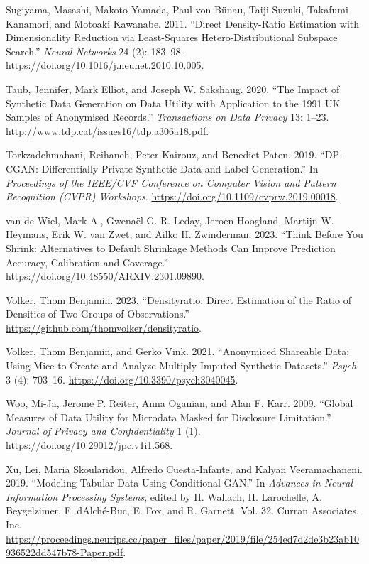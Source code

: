 \documentclass[
]{template/style/uneceart}
\newlength{\cslhangindent}
\newlength{\cslentryspacingunit} %
\newenvironment{CSLReferences}[2] %
 {%
  \setlength{\parindent}{0pt}
  \ifodd #1
  \let\oldpar\par
  \def\par{\hangindent=\cslhangindent\oldpar}
  \fi
  \setlength{\parskip}{#2\cslentryspacingunit}
 }%
 {}
\begin{document}
\begin{CSLReferences}{1}{0}
\leavevmode{}%
Sugiyama, Masashi, Makoto Yamada, Paul von Bünau, Taiji Suzuki, Takafumi
Kanamori, and Motoaki Kawanabe. 2011. {``Direct Density-Ratio Estimation
with Dimensionality Reduction via Least-Squares Hetero-Distributional
Subspace Search.''} \emph{Neural Networks} 24 (2): 183--98.
\url{https://doi.org/10.1016/j.neunet.2010.10.005}.

\leavevmode{}%
Taub, Jennifer, Mark Elliot, and Joseph W. Sakshaug. 2020. {``The Impact
of Synthetic Data Generation on Data Utility with Application to the
1991 UK Samples of Anonymised Records.''} \emph{Transactions on Data
Privacy} 13: 1--23. \url{http://www.tdp.cat/issues16/tdp.a306a18.pdf}.

\leavevmode{}%
Torkzadehmahani, Reihaneh, Peter Kairouz, and Benedict Paten. 2019.
{``{DP-CGAN}: Differentially Private Synthetic Data and Label
Generation.''} In \emph{Proceedings of the IEEE/CVF Conference on
Computer Vision and Pattern Recognition (CVPR) Workshops}.
\url{https://doi.org/10.1109/cvprw.2019.00018}.

\leavevmode{}%
van de Wiel, Mark A., Gwenaël G. R. Leday, Jeroen Hoogland, Martijn W.
Heymans, Erik W. van Zwet, and Ailko H. Zwinderman. 2023. {``Think
Before You Shrink: Alternatives to Default Shrinkage Methods Can Improve
Prediction Accuracy, Calibration and Coverage.''}
\url{https://doi.org/10.48550/ARXIV.2301.09890}.

\leavevmode{}%
Volker, Thom Benjamin. 2023. {``Densityratio: Direct Estimation of the
Ratio of Densities of Two Groups of Observations.''}
\url{https://github.com/thomvolker/densityratio}.

\leavevmode{}%
Volker, Thom Benjamin, and Gerko Vink. 2021. {``Anonymiced Shareable
Data: Using Mice to Create and Analyze Multiply Imputed Synthetic
Datasets.''} \emph{Psych} 3 (4): 703--16.
\url{https://doi.org/10.3390/psych3040045}.

\leavevmode{}%
Woo, Mi-Ja, Jerome P. Reiter, Anna Oganian, and Alan F. Karr. 2009.
{``Global Measures of Data Utility for Microdata Masked for Disclosure
Limitation.''} \emph{Journal of Privacy and Confidentiality} 1 (1).
\url{https://doi.org/10.29012/jpc.v1i1.568}.

\leavevmode{}%
Xu, Lei, Maria Skoularidou, Alfredo Cuesta-Infante, and Kalyan
Veeramachaneni. 2019. {``Modeling Tabular Data Using Conditional GAN.''}
In \emph{Advances in Neural Information Processing Systems}, edited by
H. Wallach, H. Larochelle, A. Beygelzimer, F. dAlché-Buc, E. Fox, and R.
Garnett. Vol. 32. Curran Associates, Inc.
\url{https://proceedings.neurips.cc/paper_files/paper/2019/file/254ed7d2de3b23ab10936522dd547b78-Paper.pdf}.


\end{CSLReferences}
\end{document}
